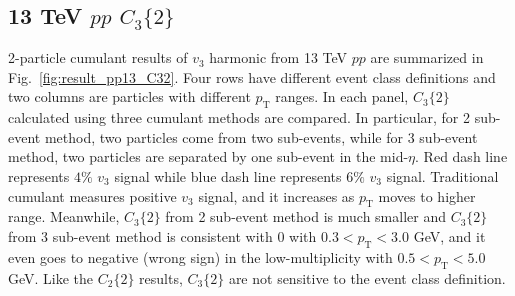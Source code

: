 \subsection{13 TeV $pp$ $C_{3}\{2\}$}
2-particle cumulant results of $v_{3}$ harmonic from 13 TeV $pp$ are summarized in Fig.~\ref{fig:result_pp13_C32}. Four rows have different event class definitions and two columns are particles with different $p_{\text{T}}$ ranges. In each panel, $C_{3}\{2\}$ calculated using three cumulant methods are compared. In particular, for 2 sub-event method, two particles come from two sub-events, while for 3 sub-event method, two particles are separated by one sub-event in the mid-$\eta$. Red dash line represents $4\%$ $v_{3}$ signal while blue dash line represents $6\%$ $v_{3}$ signal. Traditional cumulant measures positive $v_{3}$ signal, and it increases as $p_{\text{T}}$ moves to higher range. Meanwhile, $C_{3}\{2\}$ from 2 sub-event method is much smaller and $C_{3}\{2\}$ from 3 sub-event method is consistent with 0 with $0.3<p_{\text{T}}<3.0$ GeV, and it even goes to negative (wrong sign) in the low-multiplicity with $0.5<p_{\text{T}}<5.0$ GeV. Like the $C_{2}\{2\}$ results, $C_{3}\{2\}$ are not sensitive to the event class definition.
